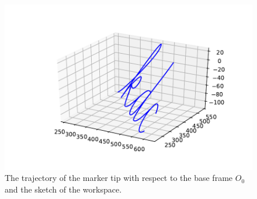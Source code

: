 \documentclass[twoside,11pt]{homework}
\begin{document}
\begin{figure}[h!]
\centering
\includegraphics[scale=1]{p5}
\caption{The trajectory of the marker tip with respect to the base frame $O_0$ and the sketch of the workspace.}
\label{F3}
\end{figure}
%
\end{document}
